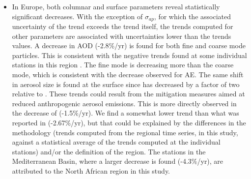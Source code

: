 \documentclass[acp, manuscript]{copernicus}
\begin{document}
\begin{itemize}
 \item In Europe, both columnar and surface parameters reveal statistically significant decreases. With the exception of $\sigma_{ap}$, for which the associated uncertainty of the trend exceeds the trend itself, the trends computed for other parameters are associated with uncertainties lower than the trends values. A decrease in AOD (-2.8\%/yr) is found for both fine and coarse mode particles. This is consistent with the negative trends found at some individual stations in this region \citep{glantz2019}. The fine mode is decreasing more than the coarse mode, which is consistent with the decrease observed for AE. The same shift in aerosol size is found at the surface since  has decreased by a factor of two relative to . These trends could result from the mitigation measures aimed at reduced anthropogenic aerosol emissions. This is more directly observed in the decrease of  (-1.5\%/yr). We find a somewhat lower trend than what was reported in \cite{aas2019global} (-2.67\%/yr), but that could be explained by the differences in the methodology (trends computed from the regional time series, in this study, against a statistical average of the trends computed at the individual stations) and/or the definition of the region. The stations in the Mediterranean Basin, where a larger decrease is found (-4.3\%/yr), are attributed to the North African region in this study.


\end{itemize}
\end{document}
